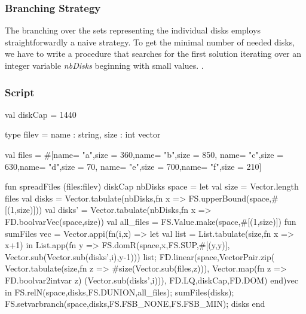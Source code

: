 \documentclass[a4paper,halfparskip]{scrartcl}
\begin{document}
\subsubsection{Branching Strategy}
The branching over the sets representing the individual disks
employs straightforwardly a naive strategy. To get the minimal
number of needed disks, we have to write a procedure that searches
for the first solution iterating over an integer variable \emph{nbDisks}
beginning with small values. .

\subsubsection{Script}
\begin{myverbatim}
val diskCap = 1440

type filev = {name : string, size : int} vector

val files = #[{name= "a",size = 360},{name= "b",size = 850},
              {name= "c",size = 630},{name= "d",size = 70},
              {name= "e",size = 700},{name= "f",size = 210}]
    

fun spreadFiles (files:filev) diskCap nbDisks space =
    let
       val size = Vector.length files
       val disks = Vector.tabulate(nbDisks,fn x => 
                      FS.upperBound(space,#[(1,size)]))
       val disks' = Vector.tabulate(nbDisks,fn x => 
                      FD.boolvarVec(space,size))
       val all_files = FS.Value.make(space,#[(1,size)])          
       fun sumFiles vec =  
           Vector.appi(fn(i,x) => 
             let 
                val list = List.tabulate(size,fn x => x+1)
             in      
                List.app(fn y => FS.domR(space,x,FS.SUP,#[(y,y)],
                           Vector.sub(Vector.sub(disks',i),y-1)))
                        list;
                FD.linear(space,VectorPair.zip(
                           Vector.tabulate(size,fn z => 
                                      #size(Vector.sub(files,z))),
                            Vector.map(fn z => FD.boolvar2intvar z)
                                 (Vector.sub(disks',i))),
                          FD.LQ,diskCap,FD.DOM)
             end)vec
   in 
       FS.relN(space,disks,FS.DUNION,all_files);
       sumFiles(disks);
       FS.setvarbranch(space,disks,FS.FSB_NONE,FS.FSB_MIN); 
       disks
   end
     
     
\end{myverbatim}
\end{document}
